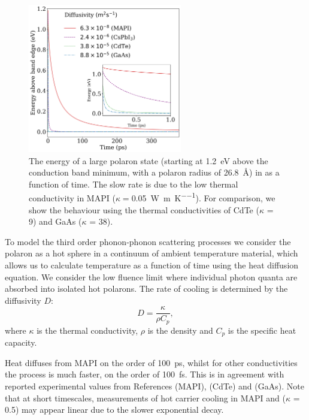 \begin{figure}[h]
\centering
  \includegraphics[width=0.6\textwidth]{figures/ch5/f4.png}
  \caption[Hot carrier cooling rate]{The energy of a large polaron state (starting at \SI{1.2}{\electronvolt} above the conduction band minimum, with a polaron radius of \SI{26.8}{\angstrom}) in  as a function of time. The slow rate is due to the low thermal conductivity in MAPI ($\kappa=$\SI{0.05}{\watt\per\metre\per\K}). For comparison, we show the behaviour using the thermal conductivities of CdTe ($\kappa$ = 9) and GaAs ($\kappa$ = 38). }
  \label{ch5TemperatureTime}
\end{figure}

To model the third order phonon-phonon scattering processes we consider the polaron as a hot sphere in a continuum of ambient temperature material, which allows us to calculate temperature as a function of time using the heat diffusion equation.
We consider the low fluence limit where individual photon quanta are absorbed into isolated hot polarons.
The rate of cooling is determined by the diffusivity $D$: 
\begin{equation}
    D= \frac{\kappa}{\rho C_p},
\end{equation} 
where $\kappa$ is the thermal conductivity, $\rho$ is the density and $C_p$ is the specific heat capacity. 

Heat diffuses from MAPI on the order of  \SI{100}{\pico\second}, whilst for other conductivities the process is much faster, on the order of \SI{100}{\femto\second}. 
This is in agreement with reported experimental values from References \cite{Klein2016} (MAPI), \cite{Zhong2017} (CdTe) and \cite{Rosenwaks1993} (GaAs). 
Note that at short timescales, measurements of hot carrier cooling in MAPI and  ($\kappa$ = 0.5) may appear linear due to the slower exponential decay.

